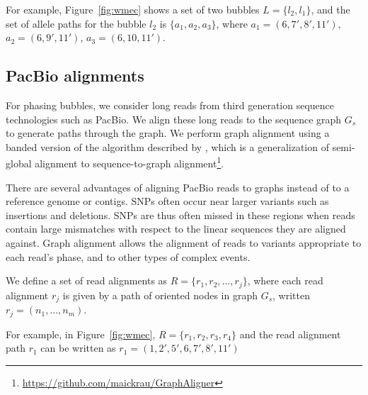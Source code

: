 For example, Figure~\ref{fig:wmec} shows a set of two bubbles $L=\{l_2, l_1\}$, and the set of allele paths for the
bubble $l_2$ is $\{a_1, a_2, a_3\}$,
where $a_1 = (6, 7', 8', 11')$, $a_2 = (6, 9', 11')$, $a_3=  (6, 10, 11')$.

\subsection{PacBio alignments} 
For phasing bubbles, we consider long reads from third generation sequence technologies such as PacBio.
We align these long reads to the sequence graph $G_s$ to generate paths through the graph.
We perform graph alignment using a banded version of the algorithm described by \cite{rautiainen2017aligning}, which is a generalization of semi-global alignment to sequence-to-graph alignment\footnote{\url{https://github.com/maickrau/GraphAligner}}.

There are several advantages of aligning PacBio reads to graphs instead of to a reference genome or contigs.
SNPs often occur near larger variants such as insertions and deletions. SNPs are thus often missed in these regions when reads contain large mismatches with respect to the linear sequences they are aligned against. Graph alignment allows the alignment of reads to variants appropriate to each read's phase, and to other types of complex events.

\begin{definition}[Alignment]
We define a set of read alignments as $R=\{r_1, r_2, \ldots, r_j\}$, where each read alignment $r_{j}$ is given by a path of oriented nodes in graph $G_s$, written $r_{j}=(n_1, \ldots, n_m)$.
\end{definition}
For example, in Figure~\ref{fig:wmec}, $R = \{r_1, r_2, r_3, r_4\}$ and the read alignment path $r_1$ can be written as 
$r_1 = (1, 2', 5', 6, 7', 8', 11' ) $


